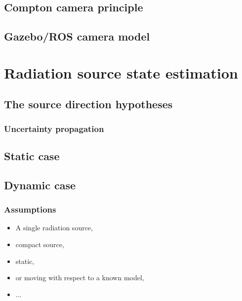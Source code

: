 \documentclass[a4paper,11pt,titlepage,twoside]{book}
\begin{document}


\section{Compton camera principle}

\section{Gazebo/ROS camera model}



\chapter{Radiation source state estimation}


\section{The source direction hypotheses}

\subsection{Uncertainty propagation}

\section{Static case}

\section{Dynamic case}

\subsection{Assumptions}

\begin{itemize}
  \item A single radiation source,
  \item compact source,
  \item static,
  \item or moving with respect to a known model,
  \item ...
\end{itemize}
\end{document}
